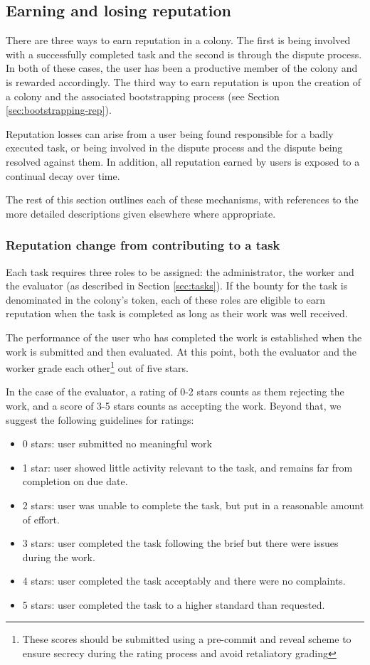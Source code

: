 \subsection{Earning and losing reputation}\label{sec:earning-losing-rep}
There are three ways to earn reputation in a colony. The first is being involved with a successfully completed task and the second is through the dispute process. In both of these cases, the user has been a productive member of the colony and is rewarded accordingly. The third way to earn reputation is upon the creation of a colony and the associated bootstrapping process (see Section \ref{sec:bootstrapping-rep}).

Reputation losses can arise from a user being found responsible for a badly executed task, or being involved in the dispute process and the dispute being resolved against them. In addition, all reputation earned by users is exposed to a continual decay over time. 

The rest of this section outlines each of these mechanisms, with references to the more detailed descriptions given elsewhere where appropriate.

\subsubsection{Reputation change from contributing to a task}\label{sec:earning-rep-from-task}
Each task requires three roles to be assigned: the administrator, the worker and the evaluator (as described in Section \ref{sec:tasks}). If the bounty for the task is denominated in the colony's token, each of these roles are eligible to earn reputation when the task is completed as long as their work was well received.

The performance of the user who has completed the work is established when the work is submitted and then evaluated. At this point, both the evaluator and the worker grade each other\footnote{These scores should be submitted using a pre-commit and reveal scheme to ensure secrecy during the rating process and avoid retaliatory grading} out of five stars.

In the case of the evaluator, a rating of 0-2 stars counts as them rejecting the work, and a score of 3-5 stars counts as accepting the work. Beyond that, we suggest the following guidelines for ratings:
\begin{itemize}
 \item[] 0 stars: user submitted no meaningful work 
 \item[]1 star:\phantom{s} user showed little activity relevant to the task, and remains far from completion on due date.
 \item[]2 stars: user was unable to complete the task, but put in a reasonable amount of effort.
 \item[]3 stars: user completed the task following the brief but there were issues during the work.
 \item[]4 stars: user completed the task acceptably and there were no complaints.
 \item[]5 stars: user completed the task to a higher standard than requested.
\end{itemize}

